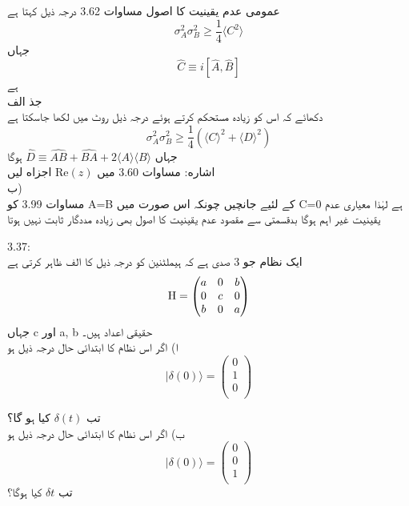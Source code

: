 عمومی عدم یقینيت کا اصول مساوات  3.62 درجہ ذيل کہتا ہے
\[\sigma_{A}^{2}\sigma_{B}^{2}\geq\frac{1}{4}\langle C^{2} \rangle\]
جہاں
\[\hat{C}\equiv i[\hat{A},\hat{B}]\]
ہے\\ 
جذ الف\\
دکھائے کہ اس کو زیادہ مستحكم کرتے ہوئے درجہ ذیل روٹ میں لکھا جاسکتا ہے
\[\sigma_{A}^{2}\sigma_{B}^{2}\geq\frac{1}{4}(\langle C\rangle^{2}+\langle D \rangle ^{2})\]
جہاں
\(\hat{D}\equiv \hat{AB}+\hat{BA}+2\langle A \rangle \langle B \rangle\)
ہوگا\\
اشاره: مساوات 3.60 میں 
\(\text{Re}(z)\)
 اجزاه لیں\\
ب)\\
مساوات 3.99 کو
 A=B
  کے لئیے جانچیں چونکہ اس صورت میں
 C=0
   ہے لہٰذا  معیاری عدم یقینیت غیر اہم ہوگا بدقسمتی سے مقصود عدم یقینيت کا اصول بھی زیادہ مددگار ثابت نہیں ہوتا\\

 3.37:\\
ایک نظام جو 3 صدی ہے کہ ہیملٹنین کو درجہ ذيل کا الف ظاہر کرتی ہے
\[\text{\text{H}}=\begin{pmatrix}
a&0&b\\
0&c&0\\
b&0&a\\
\end{pmatrix}\]
جہاں c اور a, b حقیقی اعداد ہیں۔\\
ا) اگر اس نظام کا ابتدائی حال درجہ ذيل ہو
\[|\delta(0) \rangle=\begin{pmatrix}
0\\
1\\
0\\
\end{pmatrix}\]

تب
\(\delta(t)\)
  کیا ہو گا؟\\
ب) اگر اس نظام کا ابتدائی حال درجہ ذيل ہو
\[| \delta(0)\rangle =\begin{pmatrix}
0\\
0\\
1\\
\end{pmatrix}\]
تب
 \(\delta{t}\)
  کیا ہوگا؟\\

